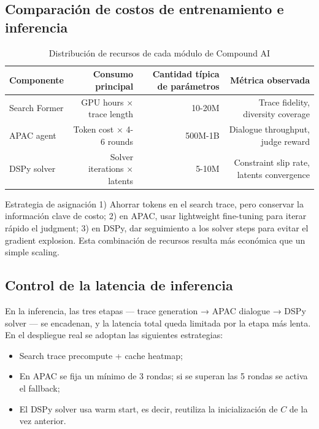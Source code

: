 \documentclass[a4paper]{article}
\begin{document}
\subsection{Comparación de costos de entrenamiento e inferencia}

\begin{table}[H]
\centering
\begin{tabular}{lrrr}
\toprule
Componente & Consumo principal & Cantidad típica de parámetros & Métrica observada \\
\midrule
Search Former & GPU hours × trace length & 10-20M & Trace fidelity, diversity coverage \\
APAC agent & Token cost × 4-6 rounds & 500M-1B & Dialogue throughput, judge reward \\
DSPy solver & Solver iterations × latents & 5-10M & Constraint slip rate, latents convergence \\
\bottomrule
\end{tabular}
\caption{Distribución de recursos de cada módulo de Compound AI}
\end{table}

\begin{importantbox}{Estrategia de asignación}
1) Ahorrar tokens en el search trace, pero conservar la información clave de costo; 2) en APAC, usar lightweight fine-tuning para iterar rápido el judgment; 3) en DSPy, dar seguimiento a los solver steps para evitar el gradient explosion. Esta combinación de recursos resulta más económica que un simple scaling.
\end{importantbox}

\subsection{Control de la latencia de inferencia}

En la inferencia, las tres etapas — trace generation → APAC dialogue → DSPy solver — se encadenan, y la latencia total queda limitada por la etapa más lenta. En el despliegue real se adoptan las siguientes estrategias:
\begin{itemize}
    \item Search trace precompute + cache heatmap;
    \item En APAC se fija un mínimo de 3 rondas; si se superan las 5 rondas se activa el fallback;
    \item El DSPy solver usa warm start, es decir, reutiliza la inicialización de \(C\) de la vez anterior.
\end{itemize}
\end{document}
